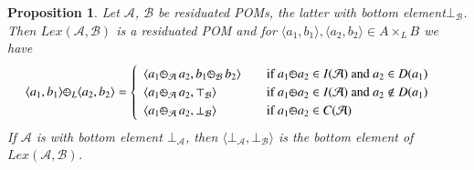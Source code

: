 \documentclass[a4paper]{elsarticle}
\newtheorem{proposition}{Proposition}
\newcommand{\1}{\mathbf{1}}
\def\odiv{{ \ominus\hspace{-8pt}:}\;}
\begin{document}
\begin{proposition}\label{def:resBI}
Let $\mathcal{A}$, $\mathcal{B}$ be residuated POMs, the latter with bottom element$\bot_\mathcal{B}$.
%
Then $Lex(\mathcal{A}, \mathcal{B})$ is a residuated POM and for $\langle a_1, b_1\rangle, \langle a_2, b_2\rangle \in A \times_L B$
we have 
\[
	\langle a_1, b_1\rangle \odiv_L \langle a_2, b_2\rangle = 	\begin{cases}
	\begin{array}{lcl}
	\langle a_1 \odiv_\mathcal{A} \, a_2, b_1  \odiv_\mathcal{B} \, b_2\rangle 
	& & \mbox{if  }  a_1 \odiv a_2 \in I(\mathcal{A}) \mbox{ and } a_2 \in D(a_1)\\
	\langle a_1 \odiv_\mathcal{A} \, a_2, \top_\mathcal{B} \rangle 
	& & \mbox{if  } a_1 \odiv a_2 \in I(\mathcal{A}) \mbox{ and } a_2 \not \in D(a_1) \\
	\langle a_1 \odiv_\mathcal{A} \, a_2, \bot_\mathcal{B} \rangle 
	& & \mbox{if  }  a_1 \odiv a_2 \in C(\mathcal{A}) 
	\end{array}
	\end{cases}
\]
If $\mathcal{A}$ is with bottom element $\bot_\mathcal{A}$, then 
$\langle \bot_\mathcal{A}, \bot_\mathcal{B} \rangle$
is the bottom element of $Lex(\mathcal{A}, \mathcal{B})$.
\end{proposition}
\end{document}
